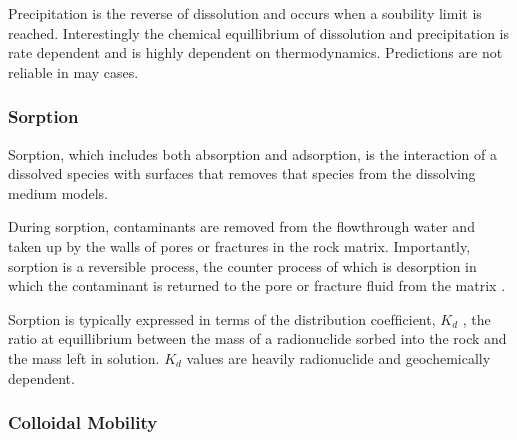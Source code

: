 {Precipitation is the reverse of dissolution and occurs when a soubility limit
is reached. Interestingly the chemical equillibrium of dissolution and
precipitation is rate dependent and is highly dependent on thermodynamics.
Predictions are not reliable in may cases.

\subsubsection{Sorption}

Sorption, which includes both absorption and adsorption,  is the interaction of a
dissolved species with surfaces that removes that species from the dissolving
medium models.

During sorption, contaminants are removed from the flowthrough water and taken up 
by the walls of pores or fractures in the rock matrix. Importantly, sorption is a 
reversible process, the  counter process of which is desorption in which the 
contaminant is returned to the pore or fracture fluid from the matrix 
 \cite{ahn_mass_1988} . 

Sorption is typically expressed in terms of the distribution coefﬁcient, $K_d$ , 
the ratio at equillibrium between the mass of a radionuclide sorbed into the 
rock and the mass left in solution. $K_d$ values are heavily radionuclide and 
geochemically dependent.  








\subsubsection{Colloidal Mobility}

}
